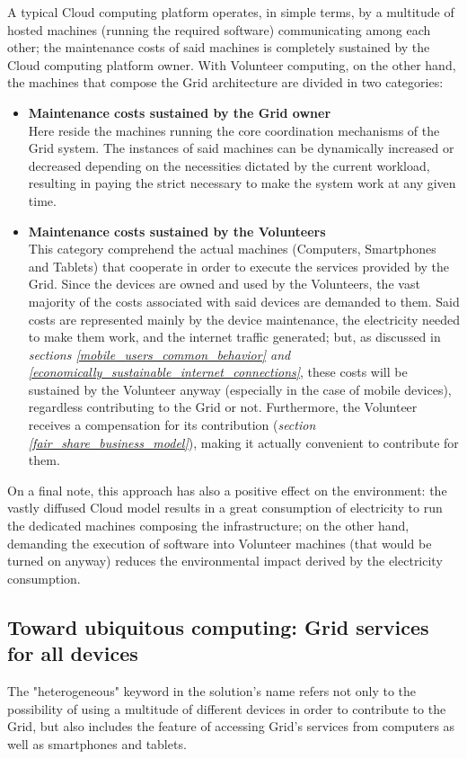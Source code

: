 A typical Cloud computing platform operates, in simple terms, by a multitude of hosted machines (running the required software) communicating among each other; the maintenance costs of said machines is completely sustained by the Cloud computing platform owner. With Volunteer computing, on the other hand, the machines that compose the Grid architecture are divided in two categories:
\begin{itemize}
    \item \textbf{Maintenance costs sustained by the Grid owner}\\
    Here reside the machines running the core coordination mechanisms of the Grid system. The instances of said machines can be dynamically increased or decreased depending on the necessities dictated by the current workload, resulting in paying the strict necessary to make the system work at any given time.
    \item \textbf{Maintenance costs sustained by the Volunteers}\\
    This category comprehend the actual machines (Computers, Smartphones and Tablets) that cooperate in order to execute the services provided by the Grid. Since the devices are owned and used by the Volunteers, the vast majority of the costs associated with said devices are demanded to them. Said costs are represented mainly by the device maintenance, the electricity needed to make them work, and the internet traffic generated; but, as discussed in \textit{sections \ref{mobile_users_common_behavior} and \ref{economically_sustainable_internet_connections}}, these costs will be sustained by the Volunteer anyway (especially in the case of mobile devices), regardless contributing to the Grid or not. Furthermore, the Volunteer receives a compensation for its contribution (\textit{section \ref{fair_share_business_model}}), making it actually convenient to contribute for them.
\end{itemize}

On a final note, this approach has also a positive effect on the environment: the vastly diffused Cloud model results in a great consumption of electricity to run the dedicated machines composing the infrastructure; on the other hand, demanding the execution of software into Volunteer machines (that would be turned on anyway) reduces the environmental impact derived by the electricity consumption.

\subsection{Toward ubiquitous computing: Grid services for all devices}\label{grid_services_for_all_devices}
The "heterogeneous" keyword in the solution's name refers not only to the possibility of using a multitude of different devices in order to contribute to the Grid, but also includes the feature of accessing Grid's services from computers as well as smartphones and tablets.

